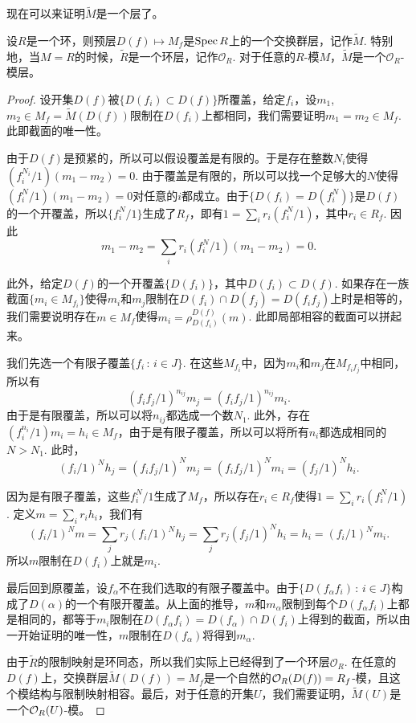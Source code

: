 现在可以来证明$\widetilde{M}$是一个层了。

\begin{thm}
设$R$是一个环，则预层$D(f)\mapsto M_f$是$\operatorname{Spec} R$上的一个交换群层，记作$\widetilde{M}$. 特别地，当$M=R$的时候，$\widetilde{R}$是一个环层，记作$\mathcal{O}_R$. 对于任意的$R$-模$M$，$\widetilde{M}$是一个$\mathcal{O}_R$-模层。
\end{thm}

\begin{proof}
设开集$D(f)$被$\{D(f_i)\subset D(f)\}$所覆盖，给定$f_i$，设$m_1$, $m_2\in M_f=\widetilde{M}(D(f))$限制在$D(f_i)$上都相同，我们需要证明$m_1=m_2\in M_f$. 此即截面的唯一性。

由于$D(f)$是预紧的，所以可以假设覆盖是有限的。于是存在整数$N_i$使得$(f_i^{N_i}/1)(m_1-m_2)=0$. 由于覆盖是有限的，所以可以找一个足够大的$N$使得$(f_i^N/1)(m_1-m_2)=0$对任意的$i$都成立。由于$\{D(f_i)=D(f_i^N)\}$是$D(f)$的一个开覆盖，所以$\{f_i^N/1\}$生成了$R_f$，即有$1=\sum_i r_i(f_i^N/1)$，其中$r_i\in R_f$. 因此
\[
	m_1-m_2=\sum_i r_i(f_i^N/1)(m_1-m_2)=0.
\]

此外，给定$D(f)$的一个开覆盖$\{D(f_i)\}$，其中$D(f_i)\subset D(f)$. 如果存在一族截面$\{m_i\in M_{f_i}\}$使得$m_i$和$m_j$限制在$D(f_i)\cap D(f_j)=D(f_if_j)$上时是相等的，我们需要说明存在$m\in M_f$使得$m_i=\rho^{D(f)}_{D(f_i)}(m)$. 此即局部相容的截面可以拼起来。

我们先选一个有限子覆盖$\{f_i\,:\,i\in J\}$. 在这些$M_{f_i}$中，因为$m_i$和$m_j$在$M_{f_if_j}$中相同，所以有
\[
	(f_if_j/1)^{n_{ij}} m_j = (f_if_j/1)^{n_{ij}} m_i.
\]
由于是有限覆盖，所以可以将$n_{ij}$都选成一个数$N_1$. 此外，存在$(f_i^{n_i}/1)m_i=h_i\in M_f$，由于是有限子覆盖，所以可以将所有$n_i$都选成相同的$N>N_1$. 此时，
\[
	(f_i/1)^N h_j=(f_if_j/1)^Nm_j=(f_if_j/1)^Nm_i=(f_j/1)^N h_i.
\]

因为是有限子覆盖，这些$f_i^N/1$生成了$M_f$，所以存在$r_i\in R_f$使得$1=\sum_i r_i (f_i^N/1)$. 定义$m=\sum_i r_ih_i$，我们有
\[
	(f_i/1)^N m =\sum_j r_j (f_i/1)^N h_j =\sum_j r_j (f_j/1)^N h_i= h_i = (f_i/1)^N m_i.
\]
所以$m$限制在$D(f_i)$上就是$m_i$.

最后回到原覆盖，设$f_\alpha$不在我们选取的有限子覆盖中。由于$\{D(f_\alpha f_i)\,:\, i\in J\}$构成了$D(\alpha)$的一个有限开覆盖。从上面的推导，$m$和$m_\alpha$限制到每个$D(f_\alpha f_i)$上都是相同的，都等于$m_i$限制在$D(f_\alpha f_i)=D(f_\alpha)\cap D(f_i)$上得到的截面，所以由一开始证明的唯一性，$m$限制在$D(f_\alpha)$将得到$m_\alpha$.

由于$\widetilde{R}$的限制映射是环同态，所以我们实际上已经得到了一个环层$\mathcal{O}_R$. 在任意的$D(f)$上，交换群层$\widetilde{M}(D(f))=M_f$是一个自然的$\mathcal{O}_R(D(f))=R_f$-模，且这个模结构与限制映射相容。最后，对于任意的开集$U$，我们需要证明，$\widetilde{M}(U)$是一个$\mathcal{O}_R(U)$-模。


\end{proof}
